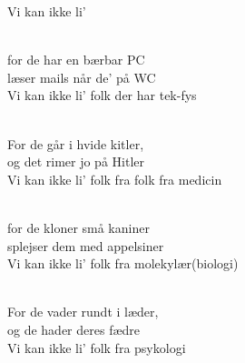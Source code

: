 \begin{song}{Vi kan ikke li'}
\begin{SBVerse}
   \\
   for de har en bærbar PC\\
   læser mails når de' på WC\\
   Vi kan ikke li' folk der har tek-fys
 \end{SBVerse}



 \begin{SBVerse}
    \\
    For de går i hvide kitler,\\
    og det rimer jo på Hitler\\
    Vi kan ikke li' folk fra folk fra medicin
  \end{SBVerse}

 \begin{SBVerse}
    \\
    for de kloner små kaniner\\
    splejser dem med appelsiner\\
    Vi kan ikke li' folk fra molekylær(biologi)
  \end{SBVerse}

 \begin{SBVerse}
    \\
    For de vader rundt i læder,\\
    og de hader deres fædre\\
    Vi kan ikke li' folk fra psykologi
  \end{SBVerse}


\end{song}
